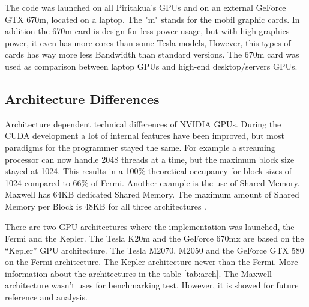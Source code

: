   The code was launched on all Piritakua's GPUs and on an external GeForce GTX 670m, located on a laptop. The "m" stands for the mobil graphic cards. In addition the 670m card is design for less power usage, but with high graphics power, it even has more cores than some Tesla models, However, this types of cards has way more less Bandwidth than standard versions. The 670m card was used as comparison between laptop GPUs and high-end desktop/servers GPUs.
     
\subsection{Architecture Differences}

  Architecture dependent technical differences of NVIDIA GPUs. During the CUDA development a lot of internal features have been improved, but most paradigms for the programmer stayed the same. For example a streaming processor can now handle 2048 threads at a time, but the maximum block size stayed at 1024. This results in a 100$\%$ theoretical occupancy for block sizes of 1024 compared to 66$\%$ of Fermi. Another example is the use of Shared Memory. Maxwell has 64KB dedicated Shared Memory. The maximum amount of Shared Memory per Block is 48KB for all three architectures \cite{hoermanngpu}.
  
  There are two GPU architectures where the implementation was launched, the Fermi and the Kepler. The Tesla K20m and the GeForce 670mx are based on the ``Kepler'' GPU architecture. The Tesla M2070, M2050 and the GeForce GTX 580 on the Fermi architecture. The Kepler architecture newer than the Fermi. More information about the architectures in the table \ref{tab:arch}. The Maxwell architecture wasn't uses for benchmarking test. However, it is showed for future reference and analysis.
  
